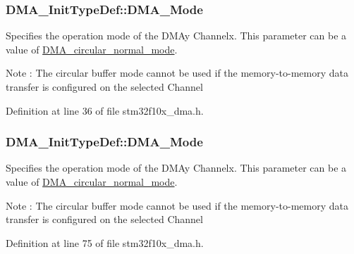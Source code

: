 \subsubsection[{\texorpdfstring{D\+M\+A\+\_\+\+Mode}{DMA_Mode}}]{ D\+M\+A\+\_\+\+Init\+Type\+Def\+::\+D\+M\+A\+\_\+\+Mode}\hypertarget{struct_d_m_a___init_type_def_a873fb281046edcce6e9d11b9299a34c8}{}\label{struct_d_m_a___init_type_def_a873fb281046edcce6e9d11b9299a34c8}
Specifies the operation mode of the D\+M\+Ay Channelx. This parameter can be a value of \hyperlink{group___d_m_a__circular__normal__mode}{D\+M\+A\+\_\+circular\+\_\+normal\+\_\+mode}. \begin{DoxyNote}{Note}
\+: The circular buffer mode cannot be used if the memory-\/to-\/memory data transfer is configured on the selected Channel 
\end{DoxyNote}


Definition at line 36 of file stm32f10x\+\_\+dma.\+h.

\subsubsection[{\texorpdfstring{D\+M\+A\+\_\+\+Mode}{DMA_Mode}}]{ D\+M\+A\+\_\+\+Init\+Type\+Def\+::\+D\+M\+A\+\_\+\+Mode}\hypertarget{struct_d_m_a___init_type_def_a8adbe6f3e46471d109afaa3111dce220}{}\label{struct_d_m_a___init_type_def_a8adbe6f3e46471d109afaa3111dce220}
Specifies the operation mode of the D\+M\+Ay Channelx. This parameter can be a value of \hyperlink{group___d_m_a__circular__normal__mode}{D\+M\+A\+\_\+circular\+\_\+normal\+\_\+mode}. \begin{DoxyNote}{Note}
\+: The circular buffer mode cannot be used if the memory-\/to-\/memory data transfer is configured on the selected Channel 
\end{DoxyNote}


Definition at line 75 of file stm32f10x\+\_\+dma.\+h.

